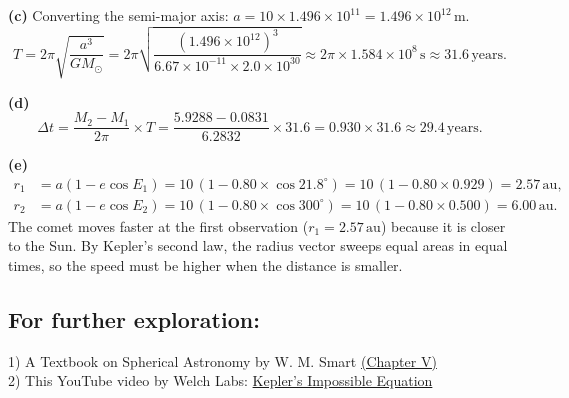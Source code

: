\documentclass[12pt]{article}
\newenvironment{probbox}[2]{%
  \begin{tcolorbox}[
    enhanced, breakable,
    colback=blue!5!white, colframe=deepblue,
    boxrule=0.8pt, arc=4pt,
    title={\bfseries [#1] Problem #2}
  ]
}{\end{tcolorbox}}
\begin{document}
\begin{probbox}{15 points}{3. Comet Time of Flight}
\textbf{(c)} Converting the semi-major axis:
$a = 10\times 1.496\times10^{11} = 1.496\times10^{12}\,\text{m}$.
\begin{equation*}
  T = 2\pi\sqrt{\frac{a^3}{GM_\odot}}
    = 2\pi\sqrt{\frac{(1.496\times10^{12})^3}{6.67\times10^{-11}\times 2.0\times10^{30}}}
    \approx 2\pi \times 1.584\times10^{8}\,\text{s}
    \approx 31.6\,\text{years}.
\end{equation*}

\textbf{(d)}
\begin{equation*}
  \Delta t = \frac{M_2 - M_1}{2\pi}\times T
           = \frac{5.9288 - 0.0831}{6.2832}\times 31.6
           = 0.930 \times 31.6
           \approx 29.4\,\text{years}.
\end{equation*}

\textbf{(e)}
\begin{align*}
  r_1 &= a(1 - e\cos E_1)
       = 10\,(1 - 0.80\times\cos 21.8^\circ)
       = 10\,(1 - 0.80\times 0.929)
       = 2.57\,\text{au},\\[4pt]
  r_2 &= a(1 - e\cos E_2)
       = 10\,(1 - 0.80\times\cos 300^\circ)
       = 10\,(1 - 0.80\times 0.500)
       = 6.00\,\text{au}.
\end{align*}
The comet moves faster at the first observation ($r_1 = 2.57\,\text{au}$) because
it is closer to the Sun. By Kepler's second law, the radius vector sweeps equal
areas in equal times, so the speed must be higher when the distance is smaller.
\end{probbox}

\subsection*{For further exploration:}
1) A Textbook on Spherical Astronomy by W. M. Smart \href{https://archive.org/details/dli.ernet.240942/page/98/mode/2up}{(Chapter V)} \\
2) This YouTube video by Welch Labs: \href{https://www.youtube.com/watch?v=hBkmyJ3TE0g}{Kepler’s Impossible Equation}

\vfill
\doclicenseThis
\end{document}

